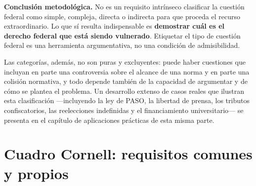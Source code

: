 \documentclass[12pt,oneside]{book}
\begin{document}
\begin{important}
\textbf{Conclusión metodológica.} No es un requisito intrínseco clasificar la cuestión federal como simple, compleja, directa o indirecta para que proceda el recurso extraordinario. Lo que sí resulta indispensable es \textbf{demostrar cuál es el derecho federal que está siendo vulnerado}. Etiquetar el tipo de cuestión federal es una herramienta argumentativa, no una condición de admisibilidad.
\end{important}

Las categorías, además, no son puras y excluyentes: puede haber cuestiones que incluyan en parte una controversia sobre el alcance de una norma y en parte una colisión normativa, y todo depende también de la capacidad de argumentar y de cómo se plantea el problema. Un desarrollo extenso de casos reales que ilustran esta clasificación ---incluyendo la ley de PASO, la libertad de prensa, los tributos confiscatorios, las reelecciones indefinidas y el financiamiento universitario--- se presenta en el capítulo de aplicaciones prácticas de esta misma parte.

\section{Cuadro Cornell: requisitos comunes y propios}
\end{document}

